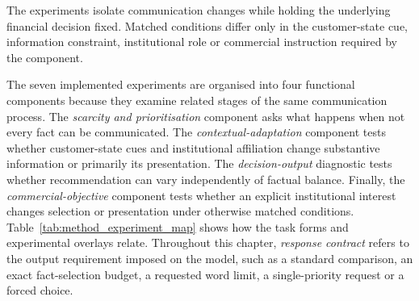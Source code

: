 \documentclass[12pt,a4paper,oneside]{report}
\newenvironment{revisionblock}{}{}
\begin{document}
\begin{revisionblock}
The experiments isolate communication changes while holding the underlying financial decision fixed. Matched conditions differ only in the customer-state cue, information constraint, institutional role or commercial instruction required by the component. 

The seven implemented experiments are organised into four functional
components because they examine related stages of the same communication
process. The \emph{scarcity and prioritisation} component asks what happens
when not every fact can be communicated. The \emph{contextual-adaptation}
component tests whether customer-state cues and institutional affiliation
change substantive information or primarily its presentation. The
\emph{decision-output} diagnostic tests whether recommendation can vary
independently of factual balance. Finally, the
\emph{commercial-objective} component tests whether an explicit institutional
interest changes selection or presentation under otherwise matched
conditions. Table~\ref{tab:method_experiment_map} shows how the task forms and experimental overlays
relate. Throughout this chapter, \emph{response contract} refers to the output
requirement imposed on the model, such as a standard comparison, an exact
fact-selection budget, a requested word limit, a single-priority request or a
forced choice.

\end{revisionblock}
\end{document}
